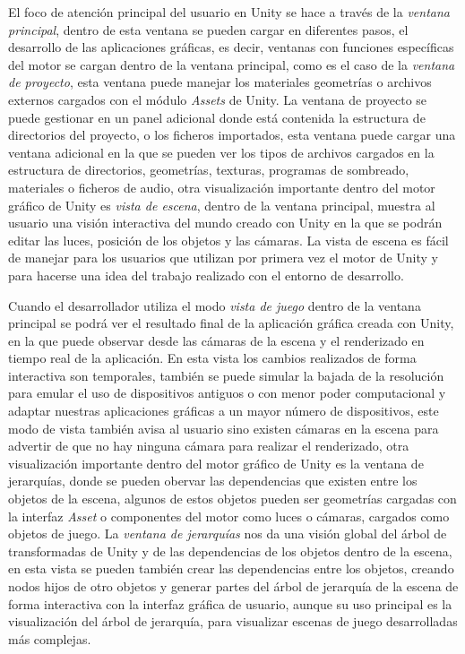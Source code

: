 \documentclass[a4paper]{book}
\begin{document}
El foco de atención principal del usuario en Unity se hace a través de la \textit{ventana principal},
dentro de esta ventana se pueden cargar en diferentes pasos, el desarrollo de las aplicaciones gráficas, es decir, ventanas con funciones
específicas del motor se cargan dentro de la ventana principal, como es el caso de la \textit{ventana de proyecto}, esta ventana puede manejar
los materiales geometrías o archivos externos cargados con el módulo \textit{Assets} de Unity. La ventana de
proyecto se puede gestionar en un panel adicional donde está contenida la estructura de directorios del proyecto, o los ficheros
importados, esta ventana puede cargar una ventana adicional en la que se pueden ver los tipos de archivos cargados en la
estructura de directorios, geometrías, texturas, programas de sombreado, materiales o ficheros de audio, otra visualización importante dentro
del motor gráfico de Unity es \textit{vista de escena}, dentro de la ventana principal, muestra al usuario una visión interactiva del mundo creado
con Unity en la que se podrán editar las luces, posición de los objetos y las cámaras. La vista de escena es fácil de manejar para los usuarios
que utilizan por primera vez el motor de Unity y para hacerse una idea del trabajo realizado con el entorno de desarrollo.

Cuando el desarrollador utiliza el modo \textit{vista de juego} dentro de la ventana principal se podrá ver el resultado final de la aplicación gráfica 
creada con Unity, en la que puede observar desde las cámaras de la escena y el renderizado en tiempo real de la aplicación. En esta vista los cambios
realizados de forma interactiva son temporales, también se puede simular la bajada de la resolución para emular el uso de dispositivos antiguos
o con menor poder computacional y adaptar nuestras aplicaciones gráficas a un mayor número de dispositivos, este modo de vista también avisa al usuario
sino existen cámaras en la escena para advertir de que no hay ninguna cámara para realizar el renderizado, otra visualización importante dentro del
motor gráfico de Unity es la ventana de jerarquías, donde se pueden obervar las dependencias que existen entre los objetos de la escena,
algunos de estos objetos pueden ser geometrías cargadas con la interfaz \textit{Asset} o componentes del motor como luces o cámaras, cargados como
objetos de juego. La \textit{ventana de jerarquías} nos da una visión global del árbol de transformadas de Unity y de
las dependencias de los objetos dentro de la escena, en esta vista se pueden también crear las dependencias entre
los objetos, creando nodos hijos de otro objetos y generar partes del árbol de jerarquía de la escena de forma interactiva con la interfaz gráfica
de usuario, aunque su uso principal es la visualización del árbol de jerarquía, para visualizar escenas de juego desarrolladas
más complejas. \cite{unity:_unity_book}
\end{document}
